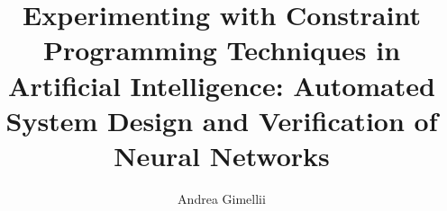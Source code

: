 \title{{Experimenting with Constraint Programming Techniques in 
		Artificial Intelligence: Automated System Design and 
		Verification of Neural Networks}}


\author{Andrea Gimellii}




\subject{LaTeX} 

\DeclareMathOperator*{\argmax}{arg\,max}

\newcommand{\liftcreate}{\textsc{LiftCreate}}
\newcommand{\liftcreatebf}{\textsc{LiftCreate-BF}}
\newcommand{\liftcreaters}{\textsc{LiftCreate-RS}}
\newcommand{\liftcreatehr}{\textsc{LiftCreate-HR}}
\newcommand{\liftcreatega}{\textsc{LiftCreate-GA}}
\newcommand{\liftcreatesmt}{\textsc{LiftCreate-SMT}}
\newcommand{\liftcreatecp}{\textsc{LiftCreate-CP}}
\newcommand{\never}{\textsc{NeVer}}
\newcommand{\nevertwo}{\textsc{NeVer2}}
\newcommand{\pynever}{\textsc{pyNeVer}}
\newcommand{\coconet}{\textsc{CoCoNet}}
\newcommand{\shark}{\textsc{shark}}
\newcommand{\hysat}{\textsc{HySAT}}
\newcommand{\pytorch}{\textsc{PyTorch}}
\newcommand{\tensorflow}{\textsc{TensorFlow}}
\newcommand{\gym}{\textsc{Gym}}
\newcommand{\stableb}{\textsc{Stable Baseline3}}
\newcommand{\pybullet}{\textsc{PyBullet}}
\newcommand{\drones}{\textsc{gym-pybullet-drones}}

\newcommand{\conc}[1]{\textsf{#1}}
\newcommand{\absc}[1]{\textsf{\textit{#1}}}
